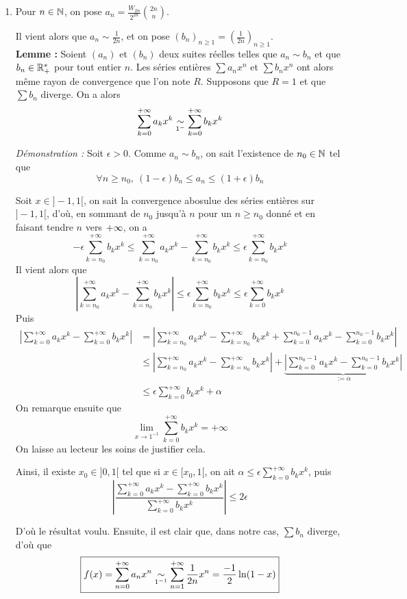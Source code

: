 \begin{sol}
\begin{enumerate}
		Ceci valant pour tout $x\in]-1,1[$, on a que $f$ est égale à la somme d'une série entière sur un domaine non trivial, d'où que $f$ est dse${}_0$.

		\item Pour $n\in\mathbb{N}$, on pose $a_n=\frac{W_{2n}}{2^{2n}}\binom{2n}n$.


		Il vient alors que $a_n\sim \frac1{2n}$, et on pose $(b_n)_{n\geq 1}=\left(\frac1{2n}\right)_{n\geq 1}$.\\


		\textbf{Lemme : } Soient $(a_n)$ et $(b_n)$ deux suites réelles telles que $a_n\sim b_n$ et que $b_n\in\mathbb{R}_+^*$ pour tout entier $n$. Les séries entières $\displaystyle\sum a_nx^n$ et $\displaystyle\sum b_nx^n$ ont alors même rayon de convergence que l'on note $R$. Supposons que $R = 1$ et que $\displaystyle\sum b_n$ diverge. On a alors \[\sum_{k=0}^{+\infty}a_kx^k\underset{1^{-}}{\sim}\sum_{k=0}^{+\infty}b_kx^k\]


		\textit{Démonstration : } Soit $\epsilon > 0$. Comme $a_n\sim b_n$, on sait l'existence de $n_0\in\mathbb{N}$ tel que \[\forall n\geq n_0,\ (1-\epsilon)b_n\leq a_n\leq (1+\epsilon)b_n\]

		Soit $x\in]-1,1[$, on sait la convergence abosulue des séries entières sur $]-1,1[$, d'où, en sommant de $n_0$ jusqu'à $n$ pour un $n\geq n_0$ donné et en faisant tendre $n$ vers $+\infty$, on a 
		\[-\epsilon\sum_{k=n_0}^{+\infty}b_kx^k\leq \sum_{k=n_0}^{+\infty}a_kx^k-\sum_{k=n_0}^{+\infty}b_kx^k\leq\epsilon\sum_{k=n_0}^{+\infty}b_kx^k\]
		Il vient alors que \[\left |\sum_{k=n_0}^{+\infty}a_kx^k-\sum_{k=n_0}^{+\infty}b_kx^k \right|\leq \epsilon\sum_{k=n_0}^{+\infty}b_kx^k\leq\epsilon\sum_{k=0}^{+\infty}b_kx^k\]
		Puis 
		\begin{align*}
			\left |\sum_{k=0}^{+\infty}a_kx^k-\sum_{k=0}^{+\infty}b_kx^k \right| & =  \left |\sum_{k=n_0}^{+\infty}a_kx^k-\sum_{k=n_0}^{+\infty}b_kx^k + \sum_{k=0}^{n_0-1}a_kx^k-\sum_{k=0}^{n_0-1}b_kx^k\right|\\
																					 & \leq \left |\sum_{k=n_0}^{+\infty}a_kx^k-\sum_{k=n_0}^{+\infty}b_kx^k \right| + \underbrace{\left|\sum_{k=0}^{n_0-1}a_kx^k-\sum_{k=0}^{n_0-1}b_kx^k\right|}_{:=\alpha}\\
																					 & \leq \epsilon\sum_{k=0}^{+\infty}b_kx^k + \alpha
		\end{align*}
		On remarque ensuite que \[\lim_{x\to1^{-1}}\sum_{k=0}^{+\infty}b_kx^k=+\infty\]
		On laisse au lecteur les soins de justifier cela.


		Ainsi, il existe $x_0\in]0, 1[$ tel que si $x\in[x_0,1[$, on ait $\alpha \leq \epsilon\displaystyle\sum_{k=0}^{+\infty}b_kx^k$, puis \[\left |\frac{\displaystyle\sum_{k=0}^{+\infty}a_kx^k-\displaystyle\sum_{k=0}^{+\infty}b_kx^k}{\displaystyle\sum_{k=0}^{+\infty}b_kx^k}\right|\leq 2\epsilon\]



		D'où le résultat voulu. Ensuite, il est clair que, dans notre cas, $\displaystyle\sum b_n$ diverge, d'où que \[\boxed{f(x)=\sum_{n=0}^{+\infty}a_nx^n\underset{1^{-1}}{\sim}\sum_{n=1}^{+\infty}\frac1{2n}x^n=\frac{-1}2\ln(1-x)}\]
	\end{enumerate}
\end{sol}

